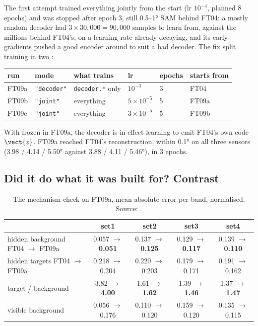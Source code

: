 The first attempt trained everything jointly from the start (lr $10^{-4}$, planned 8 epochs) and was stopped
after epoch 3, still 0.5--1° SAM behind FT04: a mostly random decoder had $3\times30{,}000=90{,}000$ samples to
learn from, against the millions behind FT04's, on a learning rate already decaying, and its early gradients
pushed a good encoder around to suit a bad decoder. The fix split training in two :

\begin{center}\small
\begin{tabular}{llllll}
\toprule
run & mode & what trains & lr & epochs & starts from\\
\midrule
FT09a & \texttt{"decoder"} & \texttt{decoder.*} only & $10^{-3}$ & 3 & FT04\\
FT09b & \texttt{"joint"} & everything & $5\times10^{-5}$ & 5 & FT09a\\
FT09c & \texttt{"joint"} & everything & $3\times10^{-5}$ & 5 & FT09b\\
\bottomrule
\end{tabular}
\end{center}
With  frozen in FT09a, the decoder is in effect learning to emit FT04's own code $\vect{z}$.
FT09a reached FT04's reconstruction, within 0.1° on all three sensors (3.98 / 4.14 / 5.50° against 3.88 / 4.11 /
5.46°), in 3 epochs.

\subsection{Did it do what it was built for? Contrast}

\begin{table}[htbp]
\centering\footnotesize\setlength{\tabcolsep}{3pt}
\begin{tabular}{lcccc}
\toprule
 & set1 & set2 & set3 & set4\\
\midrule
hidden background FT04 $\to$ FT09a & 0.057 $\to$ \textbf{0.051} & 0.137 $\to$ \textbf{0.125} & 0.129 $\to$ \textbf{0.117} & 0.139 $\to$ \textbf{0.110}\\
hidden targets FT04 $\to$ FT09a & 0.218 $\to$ 0.204 & 0.220 $\to$ 0.203 & 0.179 $\to$ 0.171 & 0.191 $\to$ 0.162\\
target / background & 3.82 $\to$ \textbf{4.00} & 1.61 $\to$ \textbf{1.62} & 1.39 $\to$ \textbf{1.46} & 1.37 $\to$ \textbf{1.47}\\
visible background & 0.056 $\to$ 0.176 & 0.110 $\to$ 0.120 & 0.159 $\to$ 0.120 & 0.135 $\to$ 0.115\\
\bottomrule
\end{tabular}
\caption{The mechanism check on FT09a, mean absolute error per band, normalised. Source:
.}
\label{tab:decoderwork:contrast}
\end{table}

